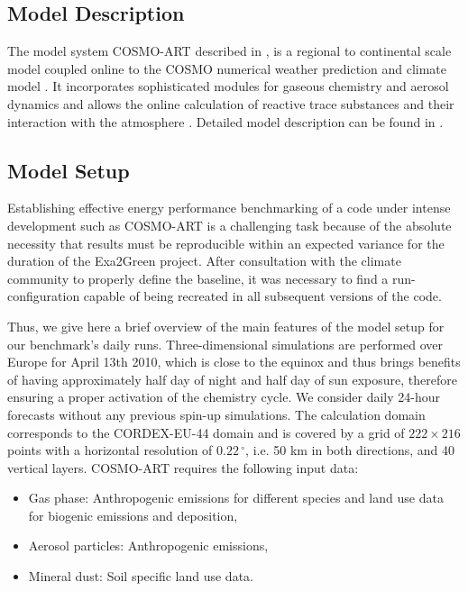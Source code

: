 \subsection{Model Description}
\label{subsec:1.1}
The  model  system COSMO-ART  described  in  \citep{Vogel-2009}, is  a
regional  to  continental scale  model  coupled  online  to the  COSMO
numerical weather  prediction and climate  model \citep{Baldauf-2011}.
It  incorporates  sophisticated  modules  for  gaseous  chemistry  and
aerosol dynamics  and allows the online calculation  of reactive trace
substances    and    their    interaction    with    the    atmosphere
\citep{Knote-2011}.  Detailed  model   description  can  be  found  in
\citep{Stanelle-2010, Bangert-2012, Knote-2011, Knote-2013}.

\subsection{Model Setup}
\label{subsec:1.2}
Establishing effective energy performance benchmarking of a code under
intense development such as COSMO-ART is a challenging task because of
the  absolute necessity that  results must  be reproducible  within an
expected  variance for the  duration of  the Exa2Green  project. After
consultation  with  the  climate  community  to  properly  define  the
baseline,  it was  necessary to  find a  run-configuration  capable of
being recreated in all subsequent versions of the code.

Thus, we give here a brief  overview of the main features of the model
setup for  our benchmark's daily  runs.  Three-dimensional simulations
are performed over  Europe for April 13th 2010, which  is close to the
equinox and thus  brings benefits of having approximately  half day of
night  and half  day  of  sun exposure,  therefore  ensuring a  proper
activation of the chemistry cycle. We consider daily 24-hour forecasts
without  any  previous spin-up  simulations.   The calculation  domain
corresponds to  the CORDEX-EU-44  domain and is  covered by a  grid of
$222\times   216$    points   with   a    horizontal   resolution   of
$0.22\,^{\circ}$,  i.e.  50  km in  both directions,  and  40 vertical
layers.  COSMO-ART requires the following input data:

\begin{itemize}
\item  Gas phase:  Anthropogenic emissions  for different  species and
  land use data for biogenic emissions and deposition,
\item Aerosol particles: Anthropogenic emissions,
\item Mineral dust: Soil specific land use data.
\end{itemize}

